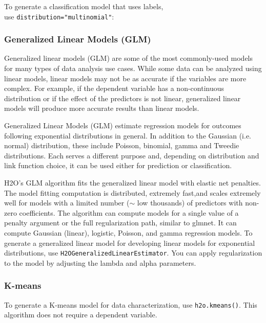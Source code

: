 {

To generate a classification model that uses labels, \\ use 
{\texttt{distribution="multinomial"}}:



\subsubsection{Generalized Linear Models (GLM)}
Generalized linear models (GLM) are some of the most commonly-used
models for many types of data analysis use cases. While some data
can be analyzed using linear models, linear models
may not be as accurate if the variables are more complex.
For example, if the dependent variable has a non-continuous
distribution or if the effect of the predictors is not linear,
generalized linear models will produce more accurate results than linear models.

Generalized Linear Models (GLM) estimate regression models for
outcomes following exponential distributions in general. In
addition to the Gaussian (i.e. normal) distribution, these include
Poisson, binomial, gamma and Tweedie distributions. Each serves
a different purpose and, depending on distribution and link
function choice, it can be used either for prediction or
classification.

H2O's GLM algorithm fits the generalized linear model with
elastic net penalties. The model fitting computation is distributed,
extremely fast,and scales extremely well for models with a limited
number ($\sim$ low thousands) of predictors with non-zero
coefficients. The algorithm can compute models for a single value of a penalty argument or the full regularization path, similar to glmnet. It can compute Gaussian (linear), logistic, Poisson, and gamma regression models.
To generate a generalized linear model for developing
linear models for exponential distributions, use
{\texttt{H2OGeneralizedLinearEstimator}}. You can apply
regularization to the model by adjusting the lambda and alpha
parameters.



\newpage
\subsubsection{K-means}
To generate a K-means model for data characterization, use
{\texttt{h2o.kmeans()}}. This algorithm does not require a
dependent variable.

}
